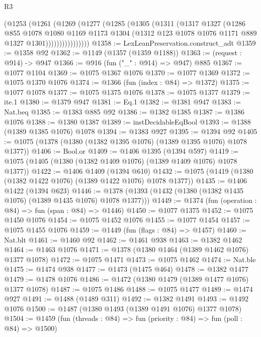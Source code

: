 \begin{lexlean}{R3}
\begin{coremodule}
                (@1253
                  (@1261
                    (@1269
                      (@1277
                        (@1285
                          (@1305
                            (@1311
                              (@1317
                                @1327
                                (@1286
                                  @855
                                  @1078
                                  @1080
                                  @1169
                                  @1173
                                  @1304
                                  (@1312 @123 @1078 @1076 @1171 @889 @1327 @1301))))))))))))))))
@1358 := LexLeanPreservation.construct_adt
@1359 := @1358 @92
@1362 := @1149 (@1357 (@1359 @1188))
@1363 := (request : @914) -> @947
@1366 := @916 (fun ("_" : @914) => @947) @885
@1367 := @1077 @1104
@1369 := @1075 @1367 @1076
@1370 := @1077 @1369
@1372 := @1075 @1370 @1076
@1374 := @1366 (fun (index : @84) => @1372)
@1375 := @1077 @1078
@1377 := @1075 @1375 @1076
@1378 := @1075 @1377
@1379 := ite.{1}
@1380 := @1379 @947
@1381 := Eq.{1}
@1382 := @1381 @947
@1383 := Nat.beq
@1385 := @1383 @885 @92
@1386 := @1382 @1385
@1387 := @1386 @1076
@1388 := @1380 @1387
@1389 := instDecidableEqBool
@1393 := @1388 (@1389 @1385 @1076) @1078
@1394 := @1383 @927
@1395 := @1394 @92
@1405 := @1075 (@1378 (@1380 (@1382 @1395 @1076) (@1389 @1395 @1076) @1078 @1377))
@1406 := Bool.or
@1409 := @1406 @1395 (@1394 @597)
@1419 := @1075 (@1405 (@1380 (@1382 @1409 @1076) (@1389 @1409 @1076) @1078 @1377))
@1422 := @1406 @1409 (@1394 @610)
@1432 := @1075 (@1419 (@1380 (@1382 @1422 @1076) (@1389 @1422 @1076) @1078 @1377))
@1435 := @1406 @1422 (@1394 @623)
@1446 := @1378 (@1393 (@1432 (@1380 (@1382 @1435 @1076) (@1389 @1435 @1076) @1078 @1377)))
@1449 := @1374 (fun (operation : @84) => fun (span : @84) => @1446)
@1450 := @1077 @1375
@1452 := @1075 @1450 @1076
@1454 := @1075 @1452 @1076
@1455 := @1077 @1454
@1457 := @1075 @1455 @1076
@1459 := @1449 (fun (flags : @84) => @1457)
@1460 := Nat.blt
@1461 := @1460 @92
@1462 := @1461 @938
@1463 := @1382 @1462
@1464 := @1463 @1076
@1471 := @1378 (@1380 @1464 (@1389 @1462 @1076) @1377 @1078)
@1472 := @1075 @1471
@1473 := @1075 @1462
@1474 := Nat.ble
@1475 := @1474 @938
@1477 := @1473 (@1475 @464)
@1478 := @1382 @1477
@1479 := @1478 @1076
@1486 := @1472 (@1380 @1479 (@1389 @1477 @1076) @1377 @1078)
@1487 := @1075 @1486
@1488 := @1075 @1477
@1489 := @1474 @927
@1491 := @1488 (@1489 @311)
@1492 := @1382 @1491
@1493 := @1492 @1076
@1500 := @1487 (@1380 @1493 (@1389 @1491 @1076) @1377 @1078)
@1504 := @1459 (fun (threads : @84) => fun (priority : @84) => fun (poll : @84) => @1500)

\end{coremodule}
\end{lexlean}
